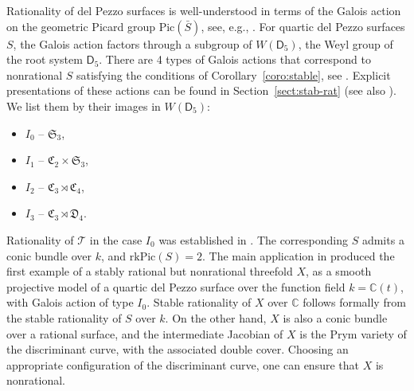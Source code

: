 \documentclass[12pt, reqno]{amsart}
\theoremstyle{plain}
\theoremstyle{remark}
\theoremstyle{definition}
\numberwithin{equation}{section}
\def\cT{{\mathcal T}}
\def\fC{{\mathfrak C}}
\def\fD{{\mathfrak D}}
\def\fS{{\mathfrak S}}
\def\fS{{\mathfrak S}}
\def\bC{{\mathbb C}}
\def\Pic{\mathrm{Pic}}
\begin{document}
Rationality of del Pezzo surfaces is well-understood in terms of the Galois action on the geometric Picard group $\Pic(\bar{S})$,  see, e.g.,  \cite{manin-book}. 
For quartic del Pezzo surfaces $S$, the Galois action factors through
a subgroup of $W(\mathsf D_5)$, the Weyl group of the root system $\mathsf D_5$.  
There are 4 types of Galois actions that correspond to nonrational $S$ satisfying the conditions of Corollary~\ref{coro:stable}, see \cite[Theorems 4.19 and 5.20]{KSS}. Explicit presentations of these actions can be found in Section~\ref{sect:stab-rat} (see also \cite{TY}).
We list them by their images in $W(\mathsf D_5)$:
\begin{itemize}
    \item $I_0$ -- $\fS_3$,
    \item $I_1$ -- $\fC_2\times \fS_3$, 
    \item $I_2$ -- $\fC_3\rtimes \fC_4$, 
    \item $I_3$ -- $\fC_3\rtimes \fD_4$. 
\end{itemize}
Rationality of $\cT$ in the case $I_0$ was established in \cite[Section 1]{bctspstably}. The corresponding $S$ admits a conic bundle over $k$, and $\mathrm{rk} \Pic(S)=2$. 
The main application in \cite{bctspstably} produced the first example of a 
stably rational but nonrational threefold $X$, as a smooth projective model of a quartic del Pezzo surface over the function field $k=\bC(t)$, with Galois action of type $I_0$. Stable rationality of $X$ over $\bC$ follows formally from the stable rationality of $S$ over $k$. On the other hand, $X$ is also a conic bundle over a rational surface, and the intermediate Jacobian of $X$ is the Prym variety of the discriminant curve, with the associated double cover. Choosing an appropriate configuration of the discriminant curve, one can ensure that $X$ is nonrational. 
\end{document}
